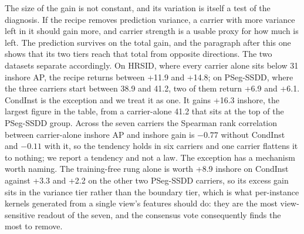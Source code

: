The size of the gain is not constant, and its variation is itself a test of the diagnosis. If the recipe removes prediction variance, a carrier with more variance left in it should gain more, and carrier strength is a usable proxy for how much is left. The prediction survives on the total gain, and the paragraph after this one shows that its two tiers reach that total from opposite directions. The two datasets separate accordingly. On HRSID, where every carrier alone sits below 31 inshore AP, the recipe returns between +11.9 and +14.8; on PSeg-SSDD, where the three carriers start between 38.9 and 41.2, two of them return +6.9 and +6.1. CondInst is the exception and we treat it as one. It gains +16.3 inshore, the largest figure in the table, from a carrier-alone 41.2 that sits at the top of the PSeg-SSDD group. Across the seven carriers the Spearman rank correlation between carrier-alone inshore AP and inshore gain is $-0.77$ without CondInst and $-0.11$ with it, so the tendency holds in six carriers and one carrier flattens it to nothing; we report a tendency and not a law. The exception has a mechanism worth naming. The training-free rung alone is worth +8.9 inshore on CondInst against +3.3 and +2.2 on the other two PSeg-SSDD carriers, so its excess gain sits in the variance tier rather than the boundary tier, which is what per-instance kernels generated from a single view's features should do: they are the most view-sensitive readout of the seven, and the consensus vote consequently finds the most to remove.

